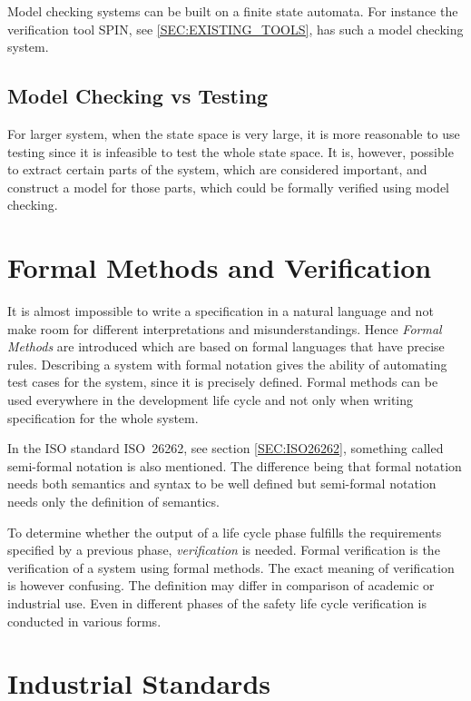 Model checking systems can be built on a finite state automata.  For instance the
verification tool SPIN, see \ref{SEC:EXISTING_TOOLS}, has such a model checking
system. \cite{HOLZMANN:SPIN}

\subsection{Model Checking vs Testing}
For larger system, when the state space is very large, it is more reasonable to
use testing since it is infeasible to test the whole state space. It is, however,
possible to extract certain parts of the system, which are considered important,
and construct a model for those parts, which could be formally verified using
model checking. \cite{MODELCHECKING:CLARKE}

\section{Formal Methods and Verification}
It is almost impossible to write a specification in a natural language
and not make room for different interpretations and
misunderstandings. Hence \emph{Formal Methods} are introduced which
are based on formal languages that have precise rules. Describing a
system with formal notation gives the ability of automating test cases
for the system, since it is precisely defined.  Formal methods can be
used everywhere in the development life cycle and not only when
writing specification for the whole system.
\cite[p.272]{COURSEBOOK:safety-critical}

In the ISO standard ISO~26262, see section \ref{SEC:ISO26262},
something called semi-formal notation is also mentioned. The
difference being that formal notation needs both semantics and syntax
to be well defined but semi-formal notation needs only the definition
of semantics. \cite{ISO26262:car}

To determine whether the output of a life cycle phase fulfills the
requirements specified by a previous phase, \emph{verification} is
needed. Formal verification is the verification of a system
using formal methods.  The exact meaning of verification is however
confusing. The definition may differ in comparison
of academic or industrial use. Even in different phases of the safety
life cycle verification is conducted in various forms.
\cite{thomas_arts}\cite[8:9.2]{ISO26262}\cite[p.309]{COURSEBOOK:safety-critical}

\section{Industrial Standards}


